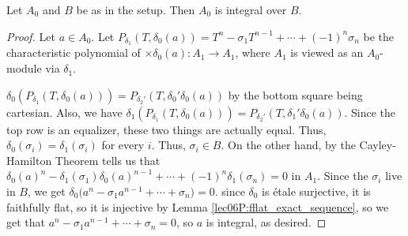 %
 \begin{lemma} \label{lec13L:A0integral/B}
   Let $A_0$ and $B$ be as in the setup. Then $A_0$ is integral over $B$.
 \end{lemma}
 \begin{proof}
   Let $a\in A_0$. Let $P_{\delta_1}(T,\delta_0(a))=T^n-\sigma_1 T^{n-1} + \cdots
   +(-1)^n \sigma_n$ be the characteristic polynomial of $\times \delta_0(a):A_1\to
   A_1$, where $A_1$ is viewed as an $A_0$-module via $\delta_1$.

   $\delta_0(P_{\delta_1}(T,\delta_0(a)))=P_{\delta_2'}(T,\delta_0'\delta_0(a))$ by the
   bottom square being cartesian. Also, we have
   $\delta_1(P_{\delta_1}(T,\delta_0(a)))=P_{\delta_2'}(T,\delta_1'\delta_0(a))$. Since
   the top row is an equalizer, these two things are actually equal. Thus,
   $\delta_0(\sigma_i)=\delta_1(\sigma_i)$ for every $i$. Thus, $\sigma_i\in B$. On the
   other hand, by the Cayley-Hamilton Theorem tells us that
   $\delta_0(a)^n-\delta_1(\sigma_1)\delta_0(a)^{n-1}+\cdots+(-1)^n
   \delta_1(\sigma_n)=0$ in $A_1$. Since the $\sigma_i$ live in $B$, we get
   $\delta_0\bigl(a^n-\sigma_1a^{n-1}+\cdots + \sigma_n\bigr)=0$. since $\delta_0$ is
   \'etale surjective, it is faithfully flat, so it is injective by Lemma
   \ref{lec06P:fflat_exact_sequence}, so we get that $a^n-\sigma_1a^{n-1}+\cdots +
   \sigma_n=0$, so $a$ is integral, as desired.
 \end{proof}
